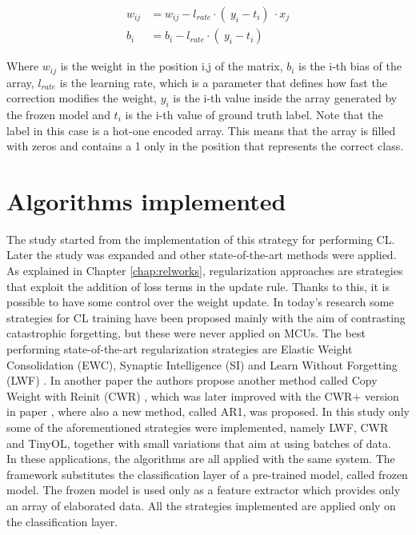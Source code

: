\documentclass[12pt]{report}
\begin{document}
\begin{align}
	w_{ij} &= w_{ij} - l_{rate} \cdot (\ y_i-t_i )\ \cdot x_j \label{w_update} \\
	b_i    &= b_i    - l_{rate} \cdot (\ y_i-t_i )\ \label{b_update} 
\end{align}

Where $w_{ij}$ is the weight in the position i,j of the matrix, $b_i$ is the i-th bias of the array, $l_{rate}$ is the learning rate, which is a parameter that defines how fast the correction modifies the weight, $y_i$ is the i-th value inside the array generated by the frozen model and $t_i$ is the i-th value of ground truth label. Note that the label in this case is a hot-one encoded array. This means that the array is filled with zeros and contains a 1 only in the position that represents the correct class.

\section{Algorithms implemented}
The study started from the implementation of this strategy for performing CL. Later the study was expanded and other state-of-the-art methods were applied. As explained in Chapter \ref{chap:relworks}, regularization approaches are strategies that exploit the addition of loss terms in the update rule. Thanks to this, it is possible to have some control over the weight update. In today's research some strategies for CL training have been proposed mainly with the aim of contrasting catastrophic forgetting, but these were never applied on MCUs. The best performing state-of-the-art regularization strategies are Elastic Weight Consolidation (EWC), Synaptic Intelligence (SI) and Learn Without Forgetting (LWF) \autocite{li2017learning}. In another paper the authors propose another method called Copy Weight with Reinit (CWR) \autocite{lomonaco2017core50}, which was later improved with the CWR+ version in paper \autocite{maltoni2019continuous}, where also a new method, called AR1, was proposed. In this study only some of the aforementioned strategies were implemented, namely LWF, CWR and TinyOL, together with small variations that aim at using batches of data. \\
In these applications, the algorithms are all applied with the same system. The framework substitutes the classification layer of a pre-trained model, called frozen model. The frozen model is used only as a feature extractor which provides only an array of elaborated data. All the strategies implemented are applied only on the classification layer.
\end{document}
